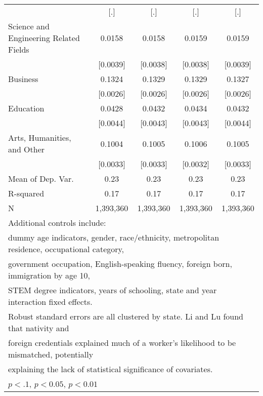\begin{table}[htbp]
\begin{tabular}{l*{4}{c}}
                    &         [.]         &         [.]         &         [.]         &         [.]         \\
\addlinespace
Science and Engineering Related Fields&      0.0158\sym{***}&      0.0158\sym{***}&      0.0159\sym{***}&      0.0159\sym{***}\\
                    &    [0.0039]         &    [0.0038]         &    [0.0038]         &    [0.0039]         \\
\addlinespace
Business            &      0.1324\sym{***}&      0.1329\sym{***}&      0.1329\sym{***}&      0.1327\sym{***}\\
                    &    [0.0026]         &    [0.0026]         &    [0.0026]         &    [0.0026]         \\
\addlinespace
Education           &      0.0428\sym{***}&      0.0432\sym{***}&      0.0434\sym{***}&      0.0432\sym{***}\\
                    &    [0.0044]         &    [0.0043]         &    [0.0043]         &    [0.0044]         \\
\addlinespace
Arts, Humanities, and Other&      0.1004\sym{***}&      0.1005\sym{***}&      0.1006\sym{***}&      0.1005\sym{***}\\
                    &    [0.0033]         &    [0.0033]         &    [0.0032]         &    [0.0033]         \\
\midrule
Mean of Dep. Var.   &        0.23         &        0.23         &        0.23         &        0.23         \\
R-squared           &        0.17         &        0.17         &        0.17         &        0.17         \\
N                   &   1,393,360         &   1,393,360         &   1,393,360         &   1,393,360         \\
\bottomrule
\multicolumn{5}{l}{\footnotesize Additional controls include:}\\
\multicolumn{5}{l}{\footnotesize dummy age indicators, gender, race/ethnicity, metropolitan residence, occupational category,}\\
\multicolumn{5}{l}{\footnotesize government occupation, English-speaking fluency, foreign born, immigration by age 10,}\\
\multicolumn{5}{l}{\footnotesize STEM degree indicators, years of schooling, state and year interaction fixed effects.}\\
\multicolumn{5}{l}{\footnotesize Robust standard errors are all clustered by state. Li and Lu found that nativity and}\\
\multicolumn{5}{l}{\footnotesize foreign credentials explained much of a worker's likelihood to be mismatched, potentially}\\
\multicolumn{5}{l}{\footnotesize explaining the lack of statistical significance of covariates.}\\
\multicolumn{5}{l}{\footnotesize \sym{*} \(p<.1\), \sym{**} \(p<0.05\), \sym{***} \(p<0.01\)}\\
\end{tabular}
\end{table}
